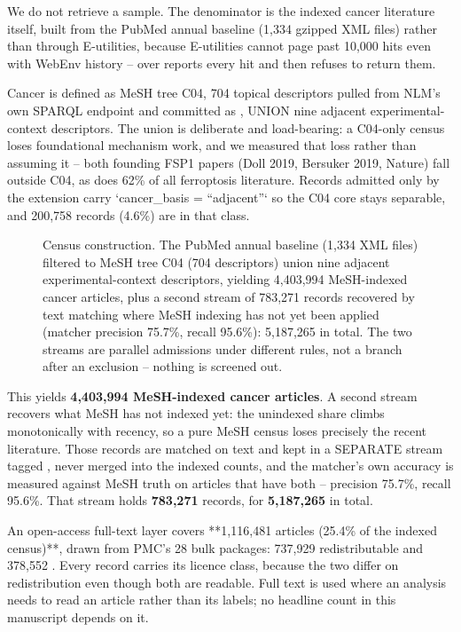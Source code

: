 \documentclass[11pt,twoside,openright]{report}
\begin{document}
We do not retrieve a sample. The denominator is the indexed cancer literature
itself, built from the PubMed annual baseline (1,334 gzipped XML files) rather
than through E-utilities, because E-utilities cannot page past 10,000 hits even
with WebEnv history --  over  reports every hit and then
refuses to return them.

Cancer is defined as MeSH tree C04, 704 topical descriptors pulled from NLM's
own SPARQL endpoint and committed as ,
UNION nine adjacent experimental-context descriptors. The union is deliberate
and load-bearing: a C04-only census loses foundational mechanism work, and we
measured that loss rather than assuming it -- both founding FSP1 papers (Doll
2019, Bersuker 2019, Nature) fall outside C04, as does 62\% of all ferroptosis
literature. Records admitted only by the extension carry `cancer\_basis =
``adjacent''` so the C04 core stays separable, and 200,758 records (4.6\%) are in
that class.

\begin{figure}[tbp]
\setcounter{figure}{19}
\caption{Census construction. The PubMed annual baseline (1,334 XML files) filtered to MeSH tree C04 (704 descriptors) union nine adjacent experimental-context descriptors, yielding 4,403,994 MeSH-indexed cancer articles, plus a second stream of 783,271 records recovered by text matching where MeSH indexing has not yet been applied (matcher precision 75.7\%, recall 95.6\%): 5,187,265 in total. The two streams are parallel admissions under different rules, not a branch after an exclusion -- nothing is screened out.}
\label{fig:fig23_census_flow}
\end{figure}

This yields \textbf{4,403,994 MeSH-indexed cancer articles}. A second stream
recovers what MeSH has not indexed yet: the unindexed share climbs
monotonically with recency, so a pure MeSH census loses precisely the recent
literature. Those records are matched on text and kept in a SEPARATE stream
tagged , never merged into the indexed counts, and the
matcher's own accuracy is measured against MeSH truth on articles that have
both -- precision 75.7\%, recall 95.6\%. That stream holds \textbf{783,271} records,
for \textbf{5,187,265} in total.

An open-access full-text layer covers **1,116,481 articles (25.4\% of the
indexed census)**, drawn from PMC's 28 bulk packages: 737,929 redistributable
 and 378,552 . Every record carries its licence class,
because the two differ on redistribution even though both are readable. Full
text is used where an analysis needs to read an article rather than its labels;
no headline count in this manuscript depends on it.
\end{document}
